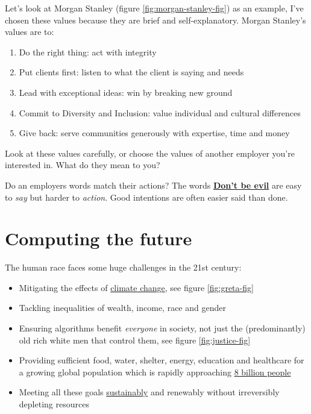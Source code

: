 \documentclass[
]{book}
\providecommand{\tightlist}{%
  \setlength{\itemsep}{0pt}\setlength{\parskip}{0pt}}
\begin{document}
Let's look at Morgan Stanley (figure \ref{fig:morgan-stanley-fig}) as an example, I've chosen these values because they are brief and self-explanatory. Morgan Stanley's values are to:

\begin{enumerate}
\def\labelenumi{\arabic{enumi}.}
\tightlist
\item
  Do the right thing: act with integrity
\item
  Put clients first: listen to what the client is saying and needs
\item
  Lead with exceptional ideas: win by breaking new ground
\item
  Commit to Diversity and Inclusion: value individual and cultural differences
\item
  Give back: serve communities generously with expertise, time and money
\end{enumerate}

Look at these values carefully, or choose the values of another employer you're interested in. What do they mean to you?

Do an employers words match their actions? The words \textbf{\href{https://en.wikipedia.org/wiki/Don\%27t_be_evil}{Don't be evil}} are easy to \emph{say} but harder to \emph{action}. Good intentions are often easier said than done.

\hypertarget{betterplace}{%
\section{Computing the future}\label{betterplace}}

The human race faces some huge challenges in the 21st century:

\begin{itemize}
\tightlist
\item
  Mitigating the effects of \href{https://en.wikipedia.org/wiki/Climate_change}{climate change}, see figure \ref{fig:greta-fig}
\item
  Tackling inequalities of wealth, income, race and gender \citep{stanley}
\item
  Ensuring algorithms benefit \emph{everyone} in society, not just the (predominantly) old rich white men that control them, see figure \ref{fig:justice-fig}
\item
  Providing sufficient food, water, shelter, energy, education and healthcare for a growing global population which is rapidly approaching \href{https://www.worldometers.info/world-population/}{8 billion people}
\item
  Meeting all these goals \href{https://en.wikipedia.org/wiki/Sustainability}{sustainably} and renewably without irreversibly depleting resources
\end{itemize}
\end{document}
